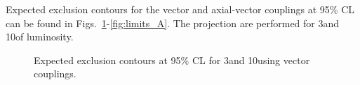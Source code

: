 Expected exclusion contours for the vector and axial-vector couplings at 95\% CL can be found in Figs.~\ref{fig:limits_V}-\ref{fig:limits_A}. The projection are performed for  3\fbinv and 10\fbinv of luminosity.

\begin{figure}[h!]
  \centering
  \caption{\label{fig:limits_V} Expected exclusion contours at 95\% CL for 3\fbinv and 10\fbinv using vector couplings. }
\end{figure}


